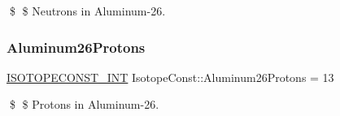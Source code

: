 \$ \$ Neutrons in Aluminum-\/26. \mbox{\label{group___isotope_const-_aluminum-_al26_gacafa298d308f2c48093b132e3b9577df}} 
\subsubsection{\texorpdfstring{Aluminum26\+Protons}{Aluminum26Protons}}
{\footnotesize\ttfamily \mbox{\hyperlink{group___isotope_const-_macros_ga5f18360b3e99483a35c32d789e62621c}{I\+S\+O\+T\+O\+P\+E\+C\+O\+N\+S\+T\+\_\+\+I\+NT}} Isotope\+Const\+::\+Aluminum26\+Protons = 13}

\$ \$ Protons in Aluminum-\/26. 